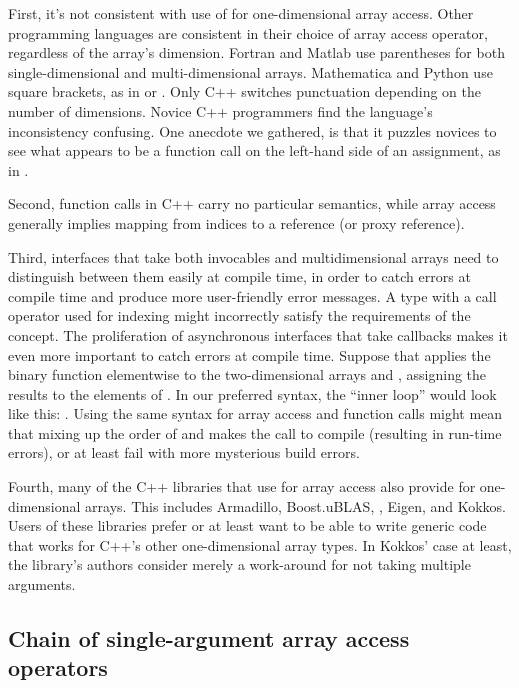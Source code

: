 \documentclass{wg21}
\begin{document}
First, it's not consistent with use of  for one-dimensional array access.  Other programming languages are consistent in their choice of array access operator, regardless of the array's dimension.  Fortran and Matlab use parentheses for both single-dimensional and multi-dimensional arrays.  Mathematica and Python use square brackets, as in  or .  Only C++ switches punctuation depending on the number of dimensions.  Novice C++ programmers find the language's inconsistency confusing.  One anecdote we gathered, is that it puzzles novices to see what appears to be a function call on the left-hand side of an assignment, as in .

Second, function calls in C++ carry no particular semantics, while array access generally implies mapping from indices to a reference (or proxy reference).

Third, interfaces that take both invocables and multidimensional arrays need to distinguish between them easily at compile time, in order to catch errors at compile time and produce more user-friendly error messages.  A type with a call operator used for indexing might incorrectly satisfy the requirements of the  concept.  The proliferation of asynchronous interfaces that take callbacks makes it even more important to catch errors at compile time.  Suppose that  applies the binary function  elementwise to the two-dimensional arrays  and , assigning the results to the elements of .  In our preferred syntax, the ``inner loop'' would look like this: .  Using the same syntax for array access and function calls might mean that mixing up the order of  and  makes the call to  compile (resulting in run-time errors), or at least fail with more mysterious build errors.

Fourth, many of the C++ libraries that use  for array access also provide  for one-dimensional arrays.  This includes Armadillo, Boost.uBLAS, , Eigen, and Kokkos.  Users of these libraries prefer  or at least want to be able to write generic code that works for C++'s other one-dimensional array types.  In Kokkos' case at least, the library's authors consider  merely a work-around for  not taking multiple arguments.

\subsection{Chain of single-argument array access operators}
\end{document}

